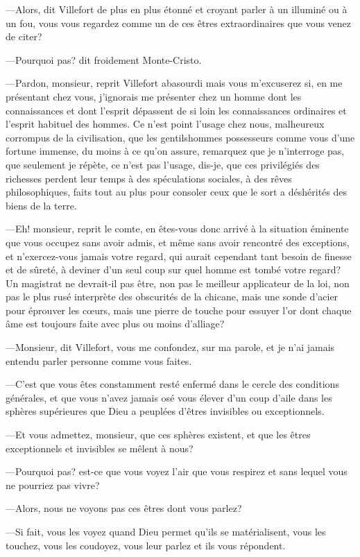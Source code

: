 —Alors, dit Villefort de plus en plus étonné et croyant parler à un illuminé ou à un fou, vous vous regardez comme un de ces êtres extraordinaires que vous venez de citer?  

—Pourquoi pas? dit froidement Monte-Cristo. 

—Pardon, monsieur, reprit Villefort abasourdi mais vous m'excuserez si, en me présentant chez vous, j'ignorais me présenter chez un homme dont les connaissances et dont l'esprit dépassent de si loin les connaissances ordinaires et l'esprit habituel des hommes. Ce n'est point l'usage chez nous, malheureux corrompus de la civilisation, que les gentilshommes possesseurs comme vous d'une fortune immense, du moins à ce qu'on assure, remarquez que je n'interroge pas, que seulement je répète, ce n'est pas l'usage, dis-je, que ces privilégiés des richesses perdent leur temps à des spéculations sociales, à des rêves philosophiques, faits tout au plus pour consoler ceux que le sort a déshérités des biens de la terre.  

—Eh! monsieur, reprit le comte, en êtes-vous donc arrivé à la situation éminente que vous occupez sans avoir admis, et même sans avoir rencontré des exceptions, et n'exercez-vous jamais votre regard, qui aurait cependant tant besoin de finesse et de sûreté, à deviner d'un seul coup sur quel homme est tombé votre regard? Un magistrat ne devrait-il pas être, non pas le meilleur applicateur de la loi, non pas le plus rusé interprète des obscurités de la chicane, mais une sonde d'acier pour éprouver les cœurs, mais une pierre de touche pour essuyer l'or dont chaque âme est toujours faite avec plus ou moins d'alliage? 

—Monsieur, dit Villefort, vous me confondez, sur ma parole, et je n'ai jamais entendu parler personne comme vous faites.  

—C'est que vous êtes constamment resté enfermé dans le cercle des conditions générales, et que vous n'avez jamais osé vous élever d'un coup d'aile dans les sphères supérieures que Dieu a peuplées d'êtres invisibles ou exceptionnels. 

—Et vous admettez, monsieur, que ces sphères existent, et que les êtres exceptionnels et invisibles se mêlent à nous? 

—Pourquoi pas? est-ce que vous voyez l'air que vous respirez et sans lequel vous ne pourriez pas vivre? 

—Alors, nous ne voyons pas ces êtres dont vous parlez? 

—Si fait, vous les voyez quand Dieu permet qu'ils se matérialisent, vous les touchez, vous les coudoyez, vous leur parlez et ils vous répondent. 

